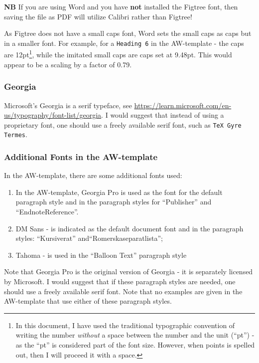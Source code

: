 \documentclass[12pt, twoside]{article}
\begin{document}
\textbf{NB} If you are using Word and you have \textbf{not} installed the Figtree font, then saving the file as PDF will utilize Calibri rather than Figtree!

As Figtree does not have a small caps font, Word sets the small caps as caps but in a smaller font. For example, for a \texttt{Heading 6} in the AW-template - the caps are 12pt\footnote{In this document, I have used the traditional typographic convention of writing the number \textit{without} a space between the number and the unit (``pt'') - as the ``pt'' is considered part of the font size. However, when points is spelled out, then I will proceed it with a space.}, while the imitated small caps are caps set at 9.48pt. This would appear to be a scaling by a factor of \num{0.79}.

\subsubsection{Georgia}
Microsoft's Georgia is a serif typeface, see \url{https://learn.microsoft.com/en-us/typography/font-list/georgia}. I would suggest that instead of using a proprietary font, one should use a freely available serif font, such as \texttt{TeX Gyre Termes}.

\subsubsection{Additional Fonts in the AW-template}
\label{sec:cycle3AdditionalFonts}

In the AW-template, there are some additional fonts used:
\begin{enumerate}
    \item In the AW-template, Georgia Pro is used as the font for the default paragraph style and in the paragraph styles for ``Publisher'' and ``EndnoteReference''.

    \item DM Sans - is indicated as the default document font and in the paragraph styles: ``Kursiverat'' and``Romerskaseparatlista'';

    \item Tahoma - is used in the ``Balloon Text'' paragraph style
\end{enumerate}

Note that Georgia Pro is the original version of Georgia - it is separately licensed by Microsoft. I would suggest that if these paragraph styles are needed, one should use a freely available serif font. Note that no examples are given in the AW-template that use either of these paragraph styles.
\end{document}
